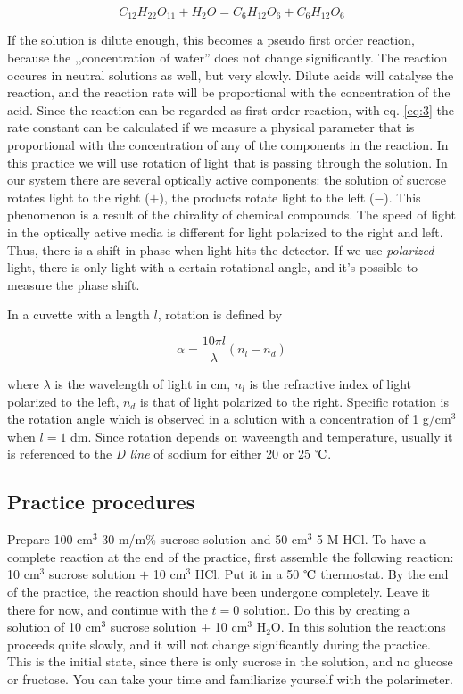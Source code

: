 \begin{equation}
\label{eq:inversion}
	C_{12}H_{22}O_{11} + H_2O = C_6H_{12}O_6 + C_6H_{12}O_6
\end{equation}

If the solution is dilute enough, this becomes a pseudo first order reaction, because the ,,concentration of water'' does not change significantly.
The reaction occures in neutral solutions as well, but very slowly. Dilute acids will catalyse the reaction, and the reaction rate will be proportional with the concentration of the acid.
Since the reaction can be regarded as first order reaction, with eq. \ref{eq:3} the rate constant can be calculated if we measure a physical parameter that is proportional with the concentration of any of the components in the reaction.
In this practice we will use rotation of light that is passing through the solution.
In our system there are several optically active components: the solution of sucrose rotates light to the right ($+$), the products rotate light to the left ($-$).
This phenomenon is a result of the chirality of chemical compounds.
The speed of light in the optically active media is different for light polarized to the right and left.
Thus, there is a shift in phase when light hits the detector. If we use \emph{polarized} light, there is only light with a certain rotational angle, and it's possible to measure the phase shift.

In a cuvette with a length $l$, rotation is defined by

\begin{equation}
\label{fig:rotation}
	\alpha
	=\frac{10 \pi l}{\lambda}
	(n_l -  n_d)
\end{equation}

where $\lambda$ is the wavelength of light in cm, $n_l$ is the refractive index of light polarized to the left, $n_d$ is that of light polarized to the right.
Specific rotation is the rotation angle which is observed in a solution with a concentration of 1 g/cm$^3$ when $l = 1$ dm.
Since rotation depends on waveength and temperature, usually it is referenced to the \emph{D line} of sodium for either 20 or 25 $\celsius$.


\subsection{Practice procedures}
Prepare 100 cm$^3$ 30 m/m\% sucrose solution and 50 cm$^3$ 5 M HCl. To have a complete reaction at the end of the practice, first assemble the following reaction: 10 cm$^3$ sucrose solution $+$ 10 cm$^3$ HCl. Put it in a 50 $\celsius$ thermostat. By the end of the practice, the reaction should have been undergone completely. Leave it there for now, and continue with the $t = 0$ solution. Do this by creating a solution of 10 cm$^3$ sucrose solution $+$ 10 cm$^3$ H$_2$O. In this solution the reactions proceeds quite slowly, and it will not change significantly during the practice. This is the initial state, since there is only sucrose in the solution, and no glucose or fructose. You can take your time and familiarize yourself with the polarimeter.

